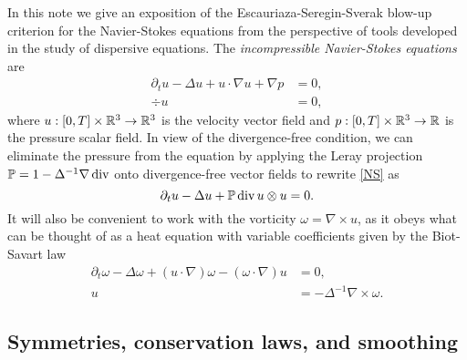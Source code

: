 
In this note we give an exposition of the Escauriaza-Seregin-Sverak blow-up criterion for the Navier-Stokes equations from the perspective of tools developed in the study of dispersive equations. The \emph{incompressible Navier-Stokes equations} are
	\begin{equation}
	\begin{split}
		\partial_t u - \Delta u + u \cdot \nabla u + \nabla p
			&= 0,\\
		\div u
			&= 0,
	\end{split}
	\tag{NS}
	\label{eq:NS}
	\end{equation}
where $u : [0, T] \times \mathbb R^3 \to \mathbb R^3$ is the velocity vector field and $p: [0, T] \times \mathbb R^3 \to \mathbb R$ is the pressure scalar field. In view of the divergence-free condition, we can eliminate the pressure from the equation by applying the Leray projection $\mathbb P = 1 - \Delta^{-1} \nabla \operatorname{div}$ onto divergence-free vector fields to rewrite \eqref{NS} as
	\begin{equation*}
		\partial_t u - \Delta u + \mathbb P \operatorname{div} u \otimes u = 0.
	\end{equation*}
It will also be convenient to work with the vorticity $\omega = \nabla \times u$, as it obeys what can be thought of as a heat equation with variable coefficients given by the Biot-Savart law
	\begin{equation}
		\begin{split}
		\partial_t \omega - \Delta \omega + (u \cdot \nabla) \omega - (\omega \cdot \nabla) u 
			&= 0,\\
		u 
			&= - \Delta^{-1} \nabla \times \omega.	
		\end{split}	\label{eq:vortNS}\tag{$\omega$-NS}
	\end{equation}	
	
\subsection{Symmetries, conservation laws, and smoothing}	
	
